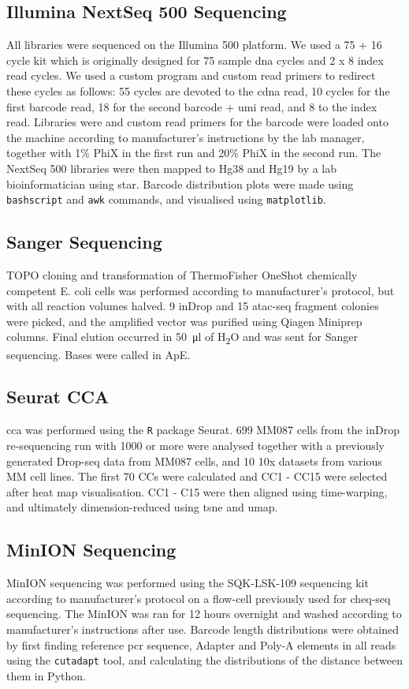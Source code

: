 \begin{appendix}
\begin{multicols}{2}
\subsection{Illumina NextSeq 500 Sequencing}
 All libraries were sequenced on the Illumina 500 platform. We used a 75 + 16 cycle kit which is originally designed for 75 sample \acrshort{dna} cycles and 2 x 8 index read cycles. We used a custom program and custom read primers to redirect these cycles as follows: 55 cycles are devoted to the \acrshort{cdna} read, 10 cycles for the first barcode read, 18 for the second barcode + \acrshort{umi} read, and 8 to the index read. Libraries were and custom read primers for the barcode were loaded onto the machine according to manufacturer's instructions by the lab manager, together with 1\% PhiX in the first run and 20\% PhiX in the second run. The NextSeq 500 libraries were then mapped to Hg38 and Hg19 by a lab bioinformatician using \acrshort{star}. Barcode distribution plots were made using \verb|bashscript| and \verb|awk| commands, and visualised using \verb|matplotlib|.\pms

\subsection{Sanger Sequencing}
TOPO cloning and transformation of ThermoFisher OneShot chemically competent E. coli cells was performed according to manufacturer's protocol, but with all reaction volumes halved. 9 inDrop and 15 \acrshort{atac-seq} fragment colonies were picked, and the amplified vector was purified using Qiagen Miniprep columns. Final elution occurred in \SI{50}{\ul} of H\textsubscript{2}O and was sent for Sanger sequencing. Bases were called in ApE.\pms

\subsection{Seurat CCA}
\acrshort{cca} was performed using the \verb|R| package Seurat. 699 MM087 cells from the inDrop re-sequencing run with 1000  or more were analysed together with a previously generated Drop-seq data from MM087 cells, and 10 10x datasets from various MM cell lines. The first 70 CCs were calculated and CC1 - CC15 were selected after heat map visualisation. CC1 - C15 were then aligned using time-warping, and ultimately dimension-reduced using \acrshort{tsne} and \acrshort{umap}.\pms

\subsection{MinION Sequencing}
MinION sequencing was performed using the SQK-LSK-109 sequencing kit according to manufacturer's protocol on a flow-cell previously used for \acrshort{cheq-seq} sequencing. The MinION was ran for 12 hours overnight and washed according to manufacturer's instructions after use. Barcode length distributions were obtained by first finding reference \acrshort{pcr} sequence, Adapter and Poly-A elements in all reads using the \verb|cutadapt| tool, and calculating the distributions of the distance between them in Python.\pms


\end{multicols}
\end{appendix}
